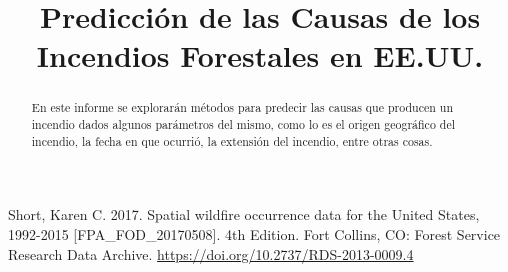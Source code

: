 \documentclass[conference]{IEEEtran}
\begin{document}
\title{Predicción de las Causas de los Incendios Forestales en EE.UU.}

\author{
}

\maketitle

\begin{abstract}
En este informe se explorarán métodos para predecir las causas que producen un incendio dados algunos parámetros del mismo, como lo es el origen geográfico del incendio, la fecha en que ocurrió, la extensión del incendio, entre otras cosas.
\end{abstract}












\begin{thebibliography}{00}
 Short, Karen C. 2017. Spatial wildfire occurrence data for the United States, 1992-2015 [FPA\_FOD\_20170508]. 4th Edition. Fort Collins, CO: Forest Service Research Data Archive. \url{https://doi.org/10.2737/RDS-2013-0009.4}

\end{thebibliography}
\newpage


\end{document}
